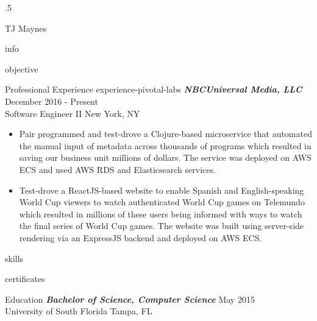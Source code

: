\documentclass[10pt]{article}
\begin{document}
\moveleft.5\hoffset\centerline{\huge TJ Maynes}
{info}

{objective}

\begin{section}{Professional Experience}
  {experience-pivotal-labs}
  {\sl \textbf{NBCUniversal Media, LLC}} \hfill December 2016 - Present \\ Software Engineer II \hfill New York, NY
  \begin{itemize}
  \item Pair programmed and test-drove a Clojure-based microservice that automated the manual input of metadata across thousands of programs which resulted in saving our business unit millions of dollars. The service was deployed on AWS ECS and used AWS RDS and Elasticsearch services.
  \item Test-drove a ReactJS-based website to enable Spanish and English-speaking World Cup viewers to watch authenticated World Cup games on Telemundo which resulted in millions of these users being informed with ways to watch the final series of World Cup games. The website was built using server-side rendering via an ExpressJS backend and deployed on AWS ECS.
  \end{itemize}
\end{section}

{skills}

{certificates}

\begin{section}{Education}
  {\sl \textbf{Bachelor of Science, Computer Science}} \hfill May 2015  \\
  University of South Florida \hfill Tampa, FL \\
\end{section}
\end{document}

